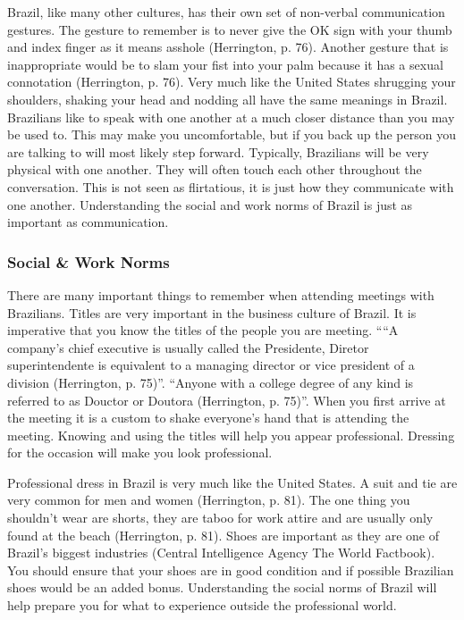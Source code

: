 \documentclass[11pt,a4paper,oneside]{report}
\begin{document}
Brazil, like many other cultures, has their own set of non-verbal communication
gestures. The gesture to remember is to never give the OK sign with your thumb
and index finger as it means asshole (Herrington, p. 76). Another gesture that
is inappropriate would be to slam your fist into your palm because it has a
sexual connotation (Herrington, p. 76). Very much like the United States
shrugging your shoulders, shaking your head and nodding all have the same
meanings in Brazil.  Brazilians like to speak with one another at a much closer
distance than you may be used to. This may make you uncomfortable, but if you
back up the person you are talking to will most likely step forward. Typically,
Brazilians will be very physical with one another. They will often touch each
other throughout the conversation. This is not seen as flirtatious, it is just
how they communicate with one another. Understanding the social and work norms
of Brazil is just as important as communication.

\subsubsection{Social \& Work Norms}\label{third}
There are many important things to remember when attending meetings with
Brazilians. Titles are very important in the business culture of Brazil. It
is imperative that you know the titles of the people you are meeting. ““A
company’s chief executive is usually called the Presidente, Diretor
superintendente is equivalent to a managing director or vice president of a
division (Herrington, p. 75)”.  “Anyone with a college degree of any kind
is referred to as Douctor or Doutora (Herrington, p. 75)”. When you first
arrive at the meeting it is a custom to shake everyone’s hand that is
attending the meeting. Knowing and using the titles will help you appear
professional. Dressing for the occasion will make you look professional.

Professional dress in Brazil is very much like the United States. A suit and
tie are very common for men and women (Herrington, p. 81). The one thing you
shouldn’t wear are shorts, they are taboo for work attire and are usually only
found at the beach (Herrington, p. 81). Shoes are important as they are one of
Brazil’s biggest industries (Central Intelligence Agency The World Factbook).
You should ensure that your shoes are in good condition and if possible
Brazilian shoes would be an added bonus. Understanding the social norms of
Brazil will help prepare you for what to experience outside the professional
world.
\end{document}

